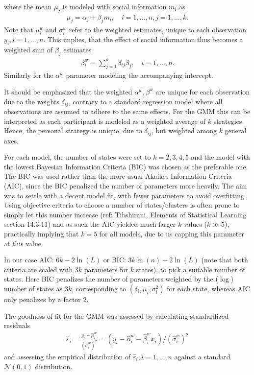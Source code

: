 \documentclass[9pt,twoside,lineno]{pnas-new}
\begin{document}
where the mean $\mu_j$ is modeled with social information $m_i$ as
\begin{align}
	\mu_j = \alpha_j+\beta_j m_i, \quad i=1,\dots,n, j=1,\dots,k.
\end{align}
Note that $\mu^w_i$ and $\sigma^w_i$ refer to the weighted estimates, unique to each observation $y_i, i=1, \dots, n$. This implies, that the effect of social information thus becomes a weighted sum of $\beta_j$ estimates
\begin{align}
	\beta^w_i = \sum_{j=1}^k \delta_{ij} \beta_{j}, \quad i=1,\dots, n. \label{eq: weighted beta}
\end{align}
Similarly for the $\alpha^w$ parameter modeling the accompanying intercept.

It should be emphasized that the weighted $\alpha^w,\beta^w$ are unique for each observation due to the weights $\delta_{ij}$, contrary to a standard regression model where all observations are assumed to adhere to the same effects. For the GMM this can be interpreted as each participant is modeled as a weighted average of $k$ strategies. Hence, the personal strategy is unique, due to $\delta_{ij}$, but weighted among $k$ general axes. 

For each model, the number of states were set to $k=2,3,4,5$ and the model with the lowest Bayesian Information Criteria (BIC) was chosen as the preferable one. The BIC was used rather than the more usual Akaikes Information Criteria (AIC), since the BIC penalized the number of parameters more heavily. The aim was to settle with a decent model fit, with fewer parameters to avoid overfitting. Using objective criteria to choose a number of states/clusters is often prone to simply let this number increase (ref: Tibshirani, Elements of Statistical Learning section 14.3.11) and as such the AIC yielded much larger $k$ values ($k \gg 5$), practically implying that $k=5$ for all models, due to us capping this parameter at this value. 

In our case AIC: $6k-2\ln(L)$ or BIC: $3k\ln(n)-2\ln(L)$ (note that both criteria are scaled with $3k$ parameters for $k$ states), to pick a suitable number of states. Here BIC penalizes the number of parameters weighted by the ($\log$) number of states as $3k$, corresponding to $(\delta_i,\mu_i,\sigma^2_i)$ for each state, whereas AIC only penalizes by a factor 2.

The goodness of fit for the GMM was assessed by calculating standardized residuals
\begin{align}
 	\hat{\varepsilon}_i = \frac{y_i - \hat{\mu}^w_i}{(\hat{\sigma}^w_i)^2} = (y_i - \hat{\alpha}^w_i-\hat{\beta}^w_ix_i)/(\hat{\sigma}^w_i)^2 \label{eq: GMM residuals}
\end{align}
and assessing the empirical distribution of $\hat{\varepsilon}_i, i=1,\dots,n$ against a standard $\mathcal{N}(0,1)$ distribution.
\end{document}
